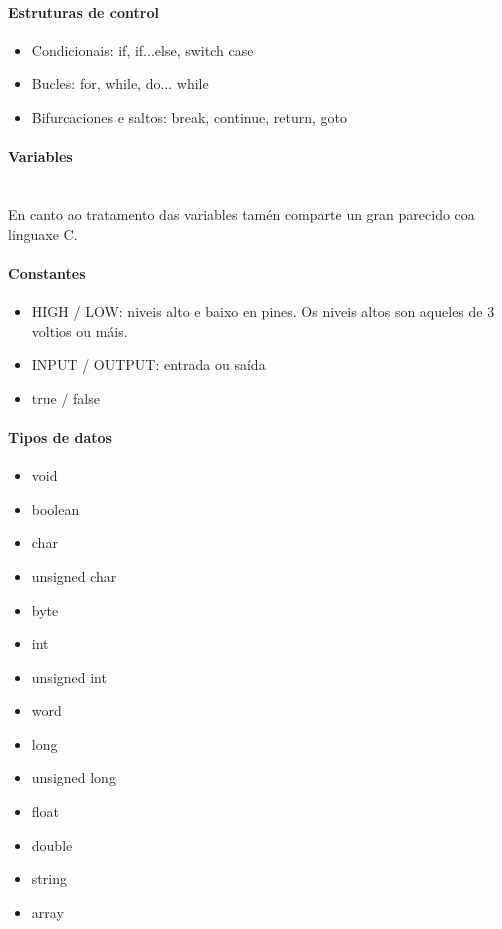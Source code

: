    \paragraph{Estruturas de control}

   \begin{itemize}
    \item Condicionais: if, if...else, switch case
    \item Bucles: for, while, do... while
    \item Bifurcaciones e saltos: break, continue, return, goto
   \end{itemize}

   \paragraph{Variables}\mbox{}\\

   En canto ao tratamento das variables tamén comparte un gran parecido coa
   linguaxe C.

   \paragraph{Constantes}

   \begin{itemize}
    \item HIGH / LOW: niveis alto e baixo en pines. Os niveis altos son aqueles
          de 3 voltios ou máis.
    \item INPUT / OUTPUT: entrada ou saída
    \item true / false
   \end{itemize}

   \paragraph{Tipos de datos}

   \begin{itemize}
    \item void
    \item boolean
    \item char
    \item unsigned char
    \item byte
    \item int
    \item unsigned int
    \item word
    \item long
    \item unsigned long
    \item float
    \item double
    \item string
    \item array
   \end{itemize}

